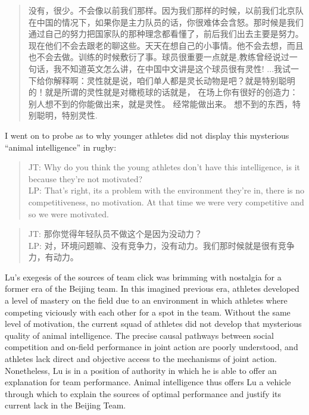 \begin{CJK}{UTF8}{gbsn}
      \begin{quotation}
        没有，很少。不会像以前我们那样。因为我们那样的时候，以前我们北京队在中国的情况下，如果你是主力队员的话，你很难体会含怒。那时候是我们通过自己的努力把国家队的那种理念都看懂了，前后我们出去主要是努力。现在他们不会去跟老的聊这些。天天在想自己的小事情。他不会去想，而且也不会去做。训练的时候敷衍了事。球员很重要一点就是,教练曾经说过一句话，我不知道英文怎么讲，在中国中文讲是这个球员很有灵性! ...我试一下给你解释啊：灵性就是说，咱们单人都是灵长动物是吧？就是特别聪明的！就是所谓的灵性就是对橄榄球的话就是， 在场上你有很好的创造力：别人想不到的你能做出来，就是灵性。 经常能做出来。 想不到的东西，特别聪明，特别灵性.
      \end{quotation}

I went on to probe as to why younger athletes did not display this mysterious ``animal intelligence'' in rugby:

\begin{quotation}
      JT: Why do you think the young athletes don't have this intelligence, is it because they're not motivated? \\
      LP: That's right, its a problem with the environment they're in, there is no competitiveness, no motivation.  At that time we were very competitive and so we were motivated.
\end{quotation}

\begin{quotation}
      JT: 那你觉得年轻队员不做这个是因为没动力？\\
      LP: 对，环境问题嘛、没有竞争力，没有动力。我们那时候就是很有竞争力，有动力。
\end{quotation}

Lu's exegesis of the sources of team click was brimming with nostalgia for a former era of the Beijing team.  In this imagined previous era,  athletes developed a level of mastery on the field due to an environment in which athletes where competing viciously with each other for a spot in the team.  Without the same level of motivation, the current squad of athletes did not develop that mysterious quality of animal intelligence.  The precise causal pathways between social competition and on-field performance in joint action are poorly understood, and athletes lack direct and objective access to the mechanisms of joint action.  Nonetheless, Lu is in a position of authority in which he is able to offer an explanation for team performance.  Animal intelligence thus offers Lu a vehicle through which to explain the sources of optimal performance and justify its current lack in the Beijing Team.


\end{CJK}
